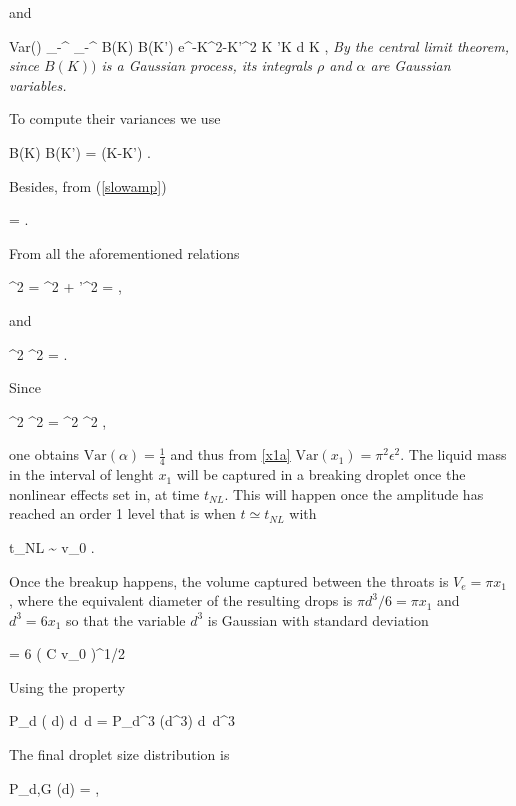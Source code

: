 and

\be
Var(\rho \alpha) \simeq  \int_{-\infty}^{\infty} \int_{-\infty}^{\infty}  B(K) B(K') e^{-K^2-K'^2}  K 'K {\textrm{d}} K , 
\nd
{\em By the central limit theorem, since $B(K))$ is a Gaussian process, its integrals $\rho$ and $\alpha$ are Gaussian variables.}

To compute their variances we use

\be
\langle B(K) \overline B(K') \rangle =  \delta(K-K') .
\nd

Besides, from (\ref{slowamp}) 

\be
\langle \rho \rangle =  . 
\nd

From all the aforementioned relations  

\be
\langle \rho^2 \rangle = \langle \rho \rangle^2 + \langle \rho'^2 \rangle =   , 
\nd

and

\be
\langle \rho^2 \alpha^2 \rangle =   . 
\nd

Since

\be
\langle \rho^2 \alpha^2 \rangle =  \langle \rho^2 \rangle \langle \alpha^2 \rangle , 
\nd

one obtains $\textrm{Var}( \alpha ) = \frac 14$
and thus from \eqref{x1a}  $\textrm{Var}(x_1) =\pi^2 \epsilon^2$.
The liquid mass in the interval of lenght $x_1$ will be captured in a breaking droplet
once the nonlinear effects set in, at time $t_{NL}$. This will happen once the
amplitude has reached an order 1 level that is when $t \simeq t_{NL}$ with

\be
t_{NL} \sim {} \ln v_0 .
\nd

Once the breakup happens, the volume captured between the throats is
$  V_e = \pi  x_1$ , where the equivalent diameter of the resulting drops is
$\pi d^3/6 =  \pi  x_1$  and $d^3 = 6  x_1$ so that
the variable $d^3$ is Gaussian with standard deviation

\be
\sigma = 6  \pi \left(  {C \ln v_0} \right)^{1/2}
\label{d6_std}
\nd

Using the property 

\be
P_d ( d) {\textrm{d}} d = P_{d^3} (d^3) {\textrm{d}} d^3
\nd

The final droplet size distribution is

\be
  P_{d,G} (d) =   \exp{} , 
\label{theory_d6}
\nd

